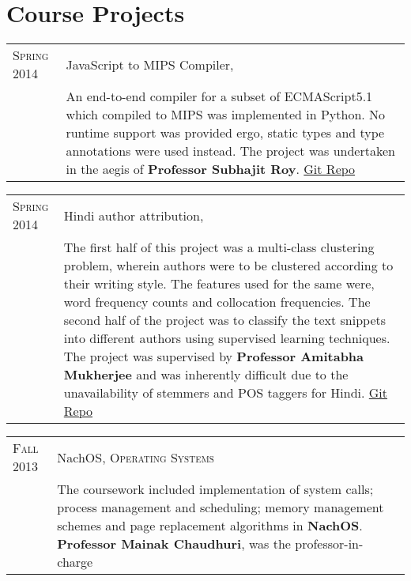 \documentclass[a4paper,10pt]{article} %
\begin{document}
\section{Course Projects}

\begin{tabular}{p{2.2cm}|p{14cm}}
    \textsc{Spring 2014} & JavaScript to MIPS Compiler, \textsc{\raggedright Compilers} \\
                         & \footnotesize{An end-to-end compiler for a subset of ECMAScript5.1
                            which compiled to MIPS was implemented in Python. No runtime support
                            was provided ergo, static types and type annotations were used instead.
                            The project was undertaken in the aegis of \textbf{Professor Subhajit Roy}.
                            \href{https://github.com/srijanshetty/javascript-compiler} {Git Repo}} \\
\end{tabular}

\begin{tabular}{p{2.2cm}|p{14cm}}
    \textsc{Spring 2014} & Hindi author attribution, \textsc{\raggedright Artificial Intelligence} \\
                         & \footnotesize{The first half of this project was a multi-class clustering problem,
                            wherein authors were to be clustered according to their writing style.
                            The features used for the same were, word frequency counts and collocation
                            frequencies.  The second half of the project was to classify the text snippets
                            into different authors using supervised learning techniques.
                            The project was supervised by \textbf{Professor Amitabha Mukherjee} and was
                            inherently difficult due to the unavailability of stemmers and POS taggers for Hindi.
                            \href{https://github.com/srijanshetty/author-attribution} {Git Repo}}\\
\end{tabular}

\begin{tabular}{p{2.2cm}|p{14cm}}
    \textsc{Fall 2013} & NachOS, \textsc{Operating Systems} \\
                       & \footnotesize{The coursework included implementation of system calls; process
                          management and scheduling; memory management schemes and page replacement
                          algorithms in \textbf{NachOS}. \textbf{Professor Mainak Chaudhuri}, was
                          the professor-in-charge}\\
\end{tabular}
\end{document}
